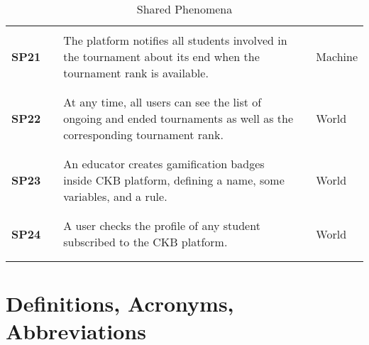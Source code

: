 \begin{longtable}[H]{l l p{8.5cm} l l}
                  &        &                                                                                                                                &        &                        \\\hline & & \\
    \textbf{SP21} & \vline & The platform notifies all students involved in the tournament about its end when the tournament rank is available.             & \vline & Machine                \\
                  &        &                                                                                                                                &        &                        \\\hline & & \\
    \textbf{SP22} & \vline & At any time, all users can see the list of ongoing and ended tournaments as well as the corresponding tournament rank.         & \vline & World                  \\
                  &        &                                                                                                                                &        &                        \\\hline & & \\
    \textbf{SP23} & \vline & An educator creates gamification badges inside CKB platform, defining a name, some variables, and a rule.                      & \vline & World                  \\
                  &        &                                                                                                                                &        &                        \\\hline & & \\
    \textbf{SP24} & \vline & A user checks the profile of any student subscribed to the CKB platform.                                                       & \vline & World                  \\
                  &        &                                                                                                                                &        &                        \\
    \hline
    \caption{Shared Phenomena}
\end{longtable}

\section{Definitions, Acronyms, Abbreviations}

